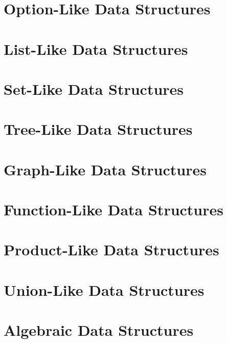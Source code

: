 \documentclass{book}
\begin{document}
\chapter{Option-Like Data Structures}\label{sec:ad:option}
 

\chapter{List-Like Data Structures}\label{sec:ad:lists}
 

\chapter{Set-Like Data Structures}\label{sec:ad:sets}
 

\chapter{Tree-Like Data Structures}\label{sec:ad:trees}
 

\chapter{Graph-Like Data Structures}\label{sec:ad:graphs}
 

\chapter{Function-Like Data Structures}\label{sec:ad:functions}

\chapter{Product-Like Data Structures}\label{sec:ad:products}

\chapter{Union-Like Data Structures}\label{sec:ad:unions}

\chapter{Algebraic Data Structures}\label{sec:ad:theories}
\end{document}

